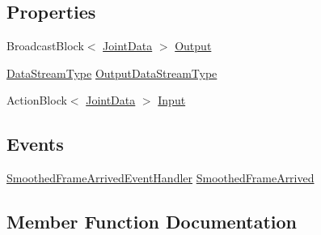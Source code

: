 \subsection*{Properties}
\begin{DoxyCompactItemize}
\item 
Broadcast\+Block$<$ \hyperlink{struct_rowing_monitor_1_1_model_1_1_util_1_1_joint_data}{Joint\+Data} $>$ \hyperlink{class_rowing_monitor_1_1_model_1_1_pipeline_1_1_smoothing_filter_a3151be406d68f220c45b674df65f0df5}{Output}
\item 
\hyperlink{namespace_rowing_monitor_1_1_model_1_1_util_a01e1a06061533b246feb7421c9d0107f}{Data\+Stream\+Type} \hyperlink{class_rowing_monitor_1_1_model_1_1_pipeline_1_1_smoothing_filter_a25304d8ea2f3e1f80ab786fb40bca304}{Output\+Data\+Stream\+Type}
\item 
Action\+Block$<$ \hyperlink{struct_rowing_monitor_1_1_model_1_1_util_1_1_joint_data}{Joint\+Data} $>$ \hyperlink{class_rowing_monitor_1_1_model_1_1_pipeline_1_1_smoothing_filter_a92bef5838dd409b0795f5b94c1ea45d5}{Input}
\end{DoxyCompactItemize}
\subsection*{Events}
\begin{DoxyCompactItemize}
\item 
\hyperlink{class_rowing_monitor_1_1_model_1_1_pipeline_1_1_smoothing_filter_af8a8a5758bd7a174033f698dcb1b93b2}{Smoothed\+Frame\+Arrived\+Event\+Handler} \hyperlink{class_rowing_monitor_1_1_model_1_1_pipeline_1_1_smoothing_filter_adfb76570d0a85e7cfd41d16121ce7a56}{Smoothed\+Frame\+Arrived}
\end{DoxyCompactItemize}


\subsection{Member Function Documentation}
\mbox{\label{class_rowing_monitor_1_1_model_1_1_pipeline_1_1_smoothing_filter_ac47b399ad4ae1ad899f5e571d6f6c05c}} 
